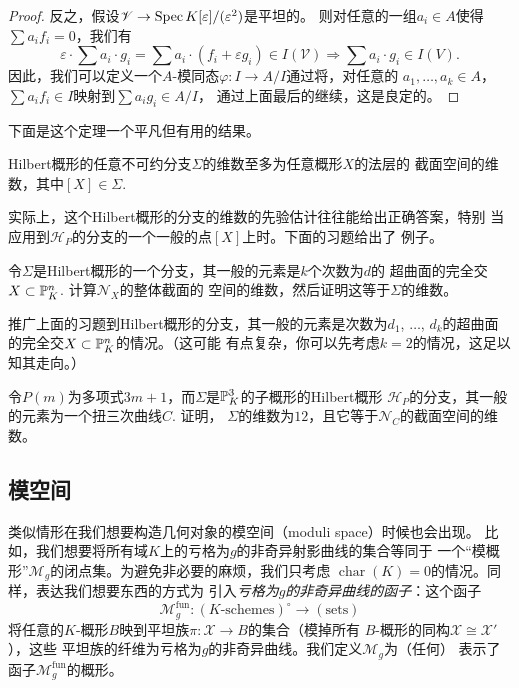 \begin{proof}
反之，假设$\mathscr V\to \spec K[\varepsilon]/(\varepsilon^2)$是平坦的。
则对任意的一组$a_i\in A$使得$\sum a_if_i=0$，我们有
\[
    \varepsilon \cdot \sum a_{i} \cdot g_{i}=\sum a_{i} \cdot (f_{i}
    +\varepsilon g_{i}) \in I(\mathscr{V}) \Longrightarrow 
    \sum a_{i} \cdot g_{i} \in I(V).
\]
因此，我们可以定义一个$A$-模同态$\varphi:I\to A/I$通过将，对任意的
$a_1,\dots,a_k\in A$，$\sum a_if_i\in I$映射到$\sum a_ig_i\in A/I$，
通过上面最后的继续，这是良定的。
\end{proof}

下面是这个定理一个平凡但有用的结果。

\begin{coro}\label{coro:6.30}
Hilbert概形的任意不可约分支$\Sigma$的维数至多为任意概形$X$的法层的
截面空间的维数，其中$[X]\in \Sigma$.
\end{coro}

实际上，这个Hilbert概形的分支的维数的先验估计往往能给出正确答案，特别
当应用到$\mathscr H_P$的分支的一个一般的点$[X]$上时。下面的习题给出了
例子。

\begin{exe}\label{exe:6.31}
    令$\Sigma$是Hilbert概形的一个分支，其一般的元素是$k$个次数为$d$的
    超曲面的完全交$X\subset \P_K^n$. 计算$\mathscr N_X$的整体截面的
    空间的维数，然后证明这等于$\Sigma$的维数。
\end{exe}

\begin{exe}\label{exe:6.32}
    推广上面的习题到Hilbert概形的分支，其一般的元素是次数为$d_1$,
    $\dots$, $d_k$的超曲面的完全交$X\subset \P_K^n$的情况。（这可能
    有点复杂，你可以先考虑$k=2$的情况，这足以知其走向。）
\end{exe}

\begin{exe}\label{exe:6.33}
    令$P(m)$为多项式$3m+1$，而$\Sigma$是$\P_K^3$的子概形的Hilbert概形
    $\mathscr H_P$的分支，其一般的元素为一个扭三次曲线$C$. 证明，
    $\Sigma$的维数为$12$，且它等于$\mathscr N_C$的截面空间的维数。
    \nottran
\end{exe}

\nottran


\subsection{模空间}\label{s:6.2.4}

类似情形在我们想要构造几何对象的模空间（moduli space）时候也会出现。
比如，我们想要将所有域$K$上的亏格为$g$的非奇异射影曲线的集合等同于
一个“模概形”$\mathscr M_g$的闭点集。为避免非必要的麻烦，我们只考虑
$\operatorname{char}(K)=0$的情况。同样，表达我们想要东西的方式为
引入\emph{亏格为$g$的非奇异曲线的函子}：这个函子
\[
    \mathscr M_g^{\text{fun}}:(\text{$K$-schemes})^\circ \to 
    (\text{sets})
\]
将任意的$K$-概形$B$映到平坦族$\pi:\mathscr X\to B$的集合（模掉所有
$B$-概形的同构$\mathscr X\cong \mathscr X'$），这些
平坦族的纤维为亏格为$g$的非奇异曲线。我们定义$\mathscr M_g$为（任何）
表示了函子$\mathscr M_g^{\text{fun}}$的概形。

